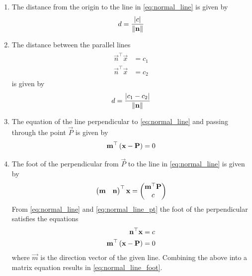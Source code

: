 \documentclass[journal,12pt,twocolumn]{IEEEtran}
\renewcommand\thesection{\arabic{section}}
\renewcommand\thesubsection{\thesection.\arabic{subsection}}
\begin{document}
\begin{enumerate}[label=\thesubsection.\arabic*.,ref=\thesubsection.\theenumi]
	\item The distance from the origin to the line  in 
	\eqref{eq:normal_line}
	is given by 
\begin{align}
	\label{eq:dist_line_2d_orig}
	d = \frac{\left\vert   c \right\vert}{\left\lVert\mathbf{n}\right\rVert}	
\end{align}
\item The distance between the parallel lines 
\begin{align}
	\label{eq:parallel_lines}
	\begin{split}
		\vec{n}^{\top}\vec{x} &= c_1
		\\
		\vec{n}^{\top}\vec{x} &= c_2
	\end{split}
\end{align}
is given by 
\begin{align}
	\label{eq:dist_lines_2d}
	d = \frac{\left\vert   c_1-c_2 \right\vert}{\left\lVert\mathbf{n}\right\rVert}	
\end{align}
\item The equation of the line perpendicular to 
	\eqref{eq:normal_line}
		and passing through the point $\vec{P}$ is given by 
\begin{align}
	\mathbf{m}^{\top}\left(\mathbf{x}-\mathbf{P}\right)  = 0
\end{align}
\item The foot of the perpendicular from $\vec{P}$ to the line in 
	\eqref{eq:normal_line}
	is given by 
\begin{align}
	\label{eq:normal_line_foot}
	\begin{pmatrix} \mathbf{m} & \mathbf{n}\end{pmatrix}^{\top}\mathbf{x}= \begin{pmatrix}\mathbf{m}^{\top}\mathbf{P}\\ c \end{pmatrix}  
\end{align}
% 
\solution From
	\eqref{eq:normal_line} and 
	\eqref{eq:normal_line_pt} 
the foot of the perpendicular satisfies the equations 
\begin{align}
	\mathbf{n}^{\top}\mathbf{x} &= c
	\\
	\mathbf{m}^{\top}\left(\mathbf{x}-\mathbf{P} \right)&=0 
\end{align}
where $\vec{m}$ is the direction vector of the given line.  Combining the above into a matrix equation results in 
	\eqref{eq:normal_line_foot}.
\end{enumerate}
 
\end{document}
